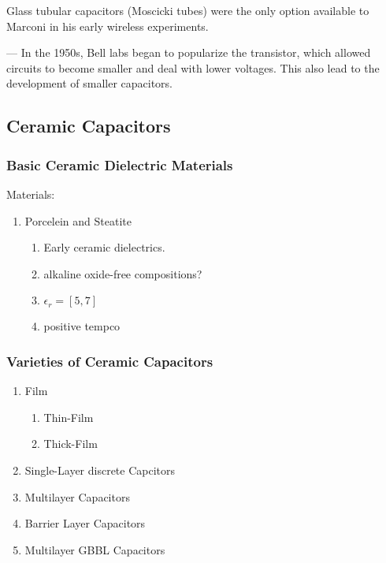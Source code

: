 Glass tubular capacitors (Moscicki tubes) were the only option available to Marconi in his early wireless experiments.\cite[f.~49-41]{dumInv}


---
In the 1950s, Bell labs began to popularize the transistor, which allowed circuits to become smaller and deal with lower voltages. This also lead to the development of smaller capacitors. \cite[f.~12]{dumInv}

\subsection{Ceramic Capacitors} \nocite{cerSurvey}
    \subsubsection{Basic Ceramic Dielectric Materials}  \cite[Ch 3 Sec IV]{cerMaterials}
        Materials:
        \begin{enumerate}
            \item Porcelein and Steatite \cite[Ch 3 Sec IV.A]{cerMaterials}
            \begin{enumerate}
                \item Early ceramic dielectrics. 
                \item alkaline oxide-free compositions?
                \item $\epsilon _r = [5,7]$
                \item positive tempco
            \end{enumerate}

        \end{enumerate}
        \cite[Ch 3 Sec IV]{cerMaterials}

        \subsubsection{Varieties of Ceramic Capacitors} \cite[Ch 3 Sec VII]{cerMaterials}
            \begin{enumerate}
                \item Film
                \begin{enumerate}
                    \item Thin-Film
                    \item Thick-Film
                \end{enumerate}
                \item Single-Layer discrete Capcitors
                \item Multilayer Capacitors
                \item Barrier Layer Capacitors
                \item Multilayer GBBL Capacitors
            \end{enumerate}


